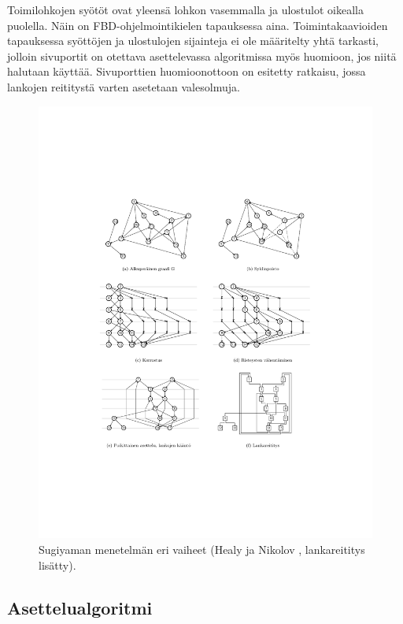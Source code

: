 \documentclass[finnish,12pt]{article}
\begin{document}
Toimilohkojen syötöt ovat yleensä lohkon vasemmalla ja ulostulot oikealla puolella.
Näin on FBD-ohjelmointikielen tapauksessa aina.
Toimintakaavioiden tapauksessa syöttöjen ja ulostulojen sijainteja ei ole määritelty yhtä tarkasti, jolloin sivuportit on otettava asettelevassa algoritmissa myös huomioon, jos niitä halutaan käyttää.
Sivuporttien huomioonottoon on esitetty ratkaisu, jossa lankojen reititystä varten asetetaan valesolmuja. \cite{RefWorks:51}


\begin{figure}[!p]
\centering
\includegraphics[width=\textwidth]{hier.pdf}
\caption{Sugiyaman menetelmän eri vaiheet (Healy ja Nikolov \cite{RefWorks:70}, lankareititys lisätty). }
\end{figure}

		\subsection{Asettelualgoritmi}
\end{document}
